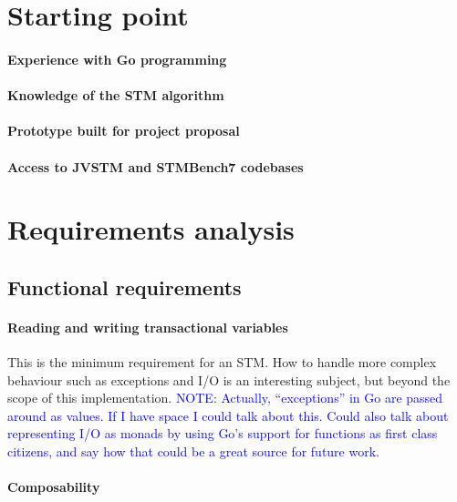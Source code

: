 \documentclass[12pt,a4paper,oneside,openright]{report}
\newcommand{\note}[1]{\textcolor{blue}{NOTE: #1}}
\begin{document}
\section{Starting point}
\label{sec:prep:starting-point}

\paragraph{Experience with Go programming}

\paragraph{Knowledge of the STM algorithm}

\paragraph{Prototype built for project proposal}

\paragraph{Access to JVSTM and STMBench7 codebases}

\section{Requirements analysis}
\label{sec:requ-analys}

\subsection{Functional requirements}
\label{sec:prep:techn-requ}

\paragraph{Reading and writing transactional variables} This is the
minimum requirement for an STM. How to handle more complex behaviour
such as exceptions and I/O is an interesting subject, but beyond the
scope of this implementation. \note{Actually, ``exceptions'' in Go are
  passed around as values. If I have space I could talk about
  this. Could also talk about representing I/O as monads by using Go's
  support for functions as first class citizens, and say how that
  could be a great source for future work.}

\paragraph{Composability}
\end{document}
